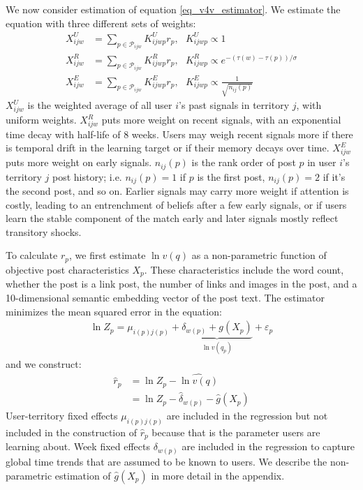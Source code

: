 We now consider estimation of equation \eqref{eq_v4v_estimator}. We estimate the equation with three different sets of weights:
\begin{align}
X_{ijw}^U &= \sum_{p \in \mathcal{P}_{ijw}} K_{ijwp}^U r_p, ~ ~ ~ K_{ijwp}^U \propto 1 \\
X_{ijw}^R &= \sum_{p \in \mathcal{P}_{ijw}} K_{ijwp}^R r_p, ~ ~ ~ K_{ijwp}^R \propto e^{-(\tau(w) - \tau(p))/\sigma}  \\
X_{ijw}^E &= \sum_{p \in \mathcal{P}_{ijw}} K_{ijwp}^E r_p, ~ ~ ~ K_{ijwp}^E \propto \frac{1}{\sqrt{n_{ij}(p)}} 
\end{align}
$X_{ijw}^U$ is the weighted average of all user $i$'s past signals in territory $j$, with uniform weights. $X_{ijw}^R$ puts more weight on recent signals, with an exponential time decay with half-life of 8 weeks. Users may weigh recent signals more if there is temporal drift in the learning target or if their memory decays over time. $X_{ijw}^E$ puts more weight on early signals. $n_{ij}(p)$ is the rank order of post $p$ in user $i$'s territory $j$ post history; i.e. $n_{ij}(p)=1$ if $p$ is the first post, $n_{ij}(p)=2$ if it's the second post, and so on. Earlier signals may carry more weight if attention is costly, leading to an entrenchment of beliefs after a few early signals, or if users learn the stable component of the match early and later signals mostly reflect transitory shocks.

To calculate $r_p$, we first estimate $\ln v(q)$ as a non-parametric function of objective post characteristics $X_p$. These characteristics include the word count, whether the post is a link post, the number of links and images in the post, and a 10-dimensional semantic embedding vector of the post text. The estimator minimizes the mean squared error in the equation:
\begin{align}
\ln Z_p = \mu_{i(p)j(p)} + \underbrace{\delta_{w(p)} + g(X_p)}_{\ln v(q_p)} + \varepsilon_p \label{eq_v4v_lnzp}
\end{align}
and we construct:
\begin{align}
\hat{r}_p &= \ln Z_p - \widehat{\ln v(q)} \nonumber \\
& = \ln Z_p - \hat{\delta}_{w(p)}-\hat{g}(X_p) \label{eq_v4v_rhat}
\end{align}
User-territory fixed effects $\mu_{i(p)j(p)}$ are included in the regression but not included in the construction of $\hat{r}_p$ because that is the parameter users are learning about. Week fixed effects $\delta_{w(p)}$ are included in the regression to capture global time trends that are assumed to be known to users. We describe the non-parametric estimation of $\hat{g}(X_p)$ in more detail in the appendix.


